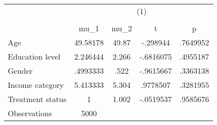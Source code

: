 {
\def\sym#1{\ifmmode^{#1}\else\(^{#1}\)\fi}
\begin{tabular}{l*{1}{cccc}}
\hline\hline
                    &\multicolumn{4}{c}{(1)}                            \\
                    &\multicolumn{4}{c}{}                               \\
                    &        mu\_1&        mu\_2&           t&           p\\
\hline
Age                 &    49.58178&       49.87&    -.298944&    .7649952\\
Education level     &    2.246444&       2.266&   -.6816075&    .4955187\\
Gender              &    .4993333&        .522&   -.9615667&    .3363138\\
Income category     &    5.413333&       5.304&    .9778507&    .3281955\\
Treatment status    &           1&       1.002&   -.0519537&    .9585676\\
\hline
Observations        &        5000&            &            &            \\
\hline\hline
\end{tabular}
}
